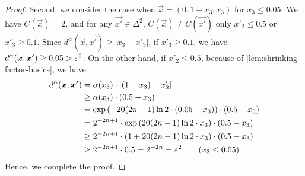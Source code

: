 \begin{proof}
    Second, we consider the case when $\vec{x}=(0,1-x_3,x_3)$ for $x_3\leq 0.05$.
    We have $C(\vec{x})=2$, and for any $\vec{x'}\in \Delta^2$, $C(\vec{x})\neq C(\vec{x'})$ only $x'_2\leq 0.5$ or $x'_3\geq 0.1$.
    Since $d^{\alpha}(\vec{x},\vec{x'})\geq |x_3-x'_3|$, if $x'_3\geq 0.1$, we have $d^{\alpha}(\boldsymbol{x},\boldsymbol{x'})\geq 0.05>\varepsilon^2$.
    On the other hand, if $x'_2\leq 0.5$, because of \cref{lem:shrinking-factor-basics}, we have 
    \begin{align*}
        d^{\alpha}(\boldsymbol{x}, \boldsymbol{x'}) &= \alpha(x_3) \cdot |(1-x_3)-x'_2| 
        \\
        &\geq \alpha(x_3)\cdot (0.5-x_3)
        \\
        &= \exp\left( -20(2n-1)\ln 2 \cdot (0.05-x_3) \right) \cdot (0.5-x_3)
        \\
        &=
        2^{-2n+1} \cdot \exp\left( 20(2n-1)\ln 2 \cdot x_3 \right) \cdot (0.5-x_3)
        \\
        &\geq 
        2^{-2n+1} \cdot (1+20(2n-1)\ln 2\cdot x_3) \cdot (0.5-x_3)\
        \\
        &\geq 
        2^{-2n+1} \cdot 0.5 
        =2^{-2n}
        =\varepsilon^2
        \tag{$x_3\leq 0.05$}
    \end{align*}
    Hence, we complete the proof.
\end{proof}

